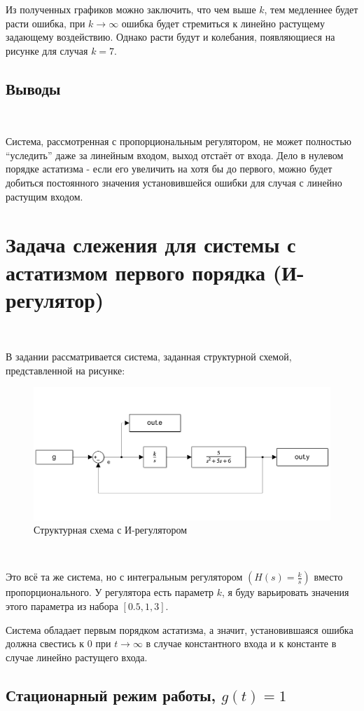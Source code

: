\documentclass[a4paper]{article}
\begin{document}
Из полученных графиков можно заключить, что чем выше $k$, тем медленнее будет расти ошибка, при $k \to \infty$ ошибка будет стремиться к линейно растущему задающему воздействию. Однако расти будут и колебания, появляющиеся на рисунке для случая $k = 7$.

\subsection{Выводы}\ 

Система, рассмотренная с пропорциональным регулятором, не может полностью ``уследить'' даже за линейным входом, выход отстаёт от входа. Дело в нулевом порядке астатизма - если его увеличить на хотя бы до первого, можно будет добиться постоянного значения установившейся ошибки для случая с линейно растущим входом.

\section{Задача слежения для системы с астатизмом первого порядка (И-регулятор)}\

В задании рассматривается система, заданная структурной схемой, представленной на рисунке:

\begin{figure}[H]
    \centering
    \includegraphics[width=0.65\linewidth]{ex4/scheme.png}
    \caption{Структурная схема с И-регулятором}
\end{figure}\

Это всё та же система, но с интегральным регулятором $(H(s) = \frac{k}{s})$ вместо пропорционального. У регулятора есть параметр $k$, я буду варьировать значения этого параметра из набора $[0.5, 1, 3]$.\ 

Система обладает первым порядком астатизма, а значит, установившаяся ошибка должна свестись к $0$ при $t \to \infty$ в случае константного входа и к константе в случае линейно растущего входа. 

\subsection{Стационарный режим работы, $g(t) = 1$}\
\end{document}
